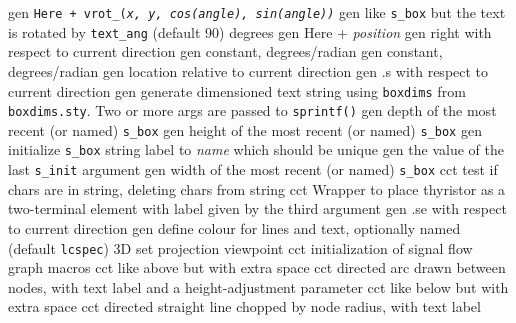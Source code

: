   {gen}
  {\tt Here + vrot\_({\sl x, y, cos(angle), sin(angle))}}
  {gen}
  {like {\tt s\_box} but the text is rotated by {\tt text\_ang}
   (default 90) degrees}
  {gen}
  {Here + {\sl position}}
  {gen}
  {right with respect to current direction}
  {gen}
  {constant, degrees/radian}
  {gen}
  {constant, degrees/radian}
  {gen}
  {location relative to current direction}
  {gen}
  {.s with respect to current direction}
  {gen}
  {generate dimensioned text string using {\tt{}boxdims} from
    {\tt boxdims.sty}. Two or more args are passed to {\tt sprintf()} }
  {gen}
  {depth of the most recent (or named) {\tt s\_box}}
  {gen}
  {height of the most recent (or named) {\tt s\_box}}
  {gen}
  {initialize {\tt s\_box} string label to {\sl name} which should be unique}
  {gen}
  {the value of the last {\tt s\_init} argument}
  {gen}
  {width of the most recent (or named) {\tt s\_box}}
  {cct}
  {test if chars are in string, deleting chars from string}
  {cct}
  {Wrapper to place thyristor as a two-terminal element with label given by
   the third argument}
  {gen}
  {.se with respect to current direction}
  {gen}
  {define colour for lines and text, optionally named (default {\tt lcspec})}
  {3D}
  {set projection viewpoint}
  {cct}
  {initialization of signal flow graph macros}
  {cct}
  {like above but with extra space}
  {cct}
  {directed arc drawn between nodes, with text label
    and a height-adjustment parameter }
  {cct}
  {like below but with extra space}
  {cct}
  {directed straight line chopped by node radius, with text label}
